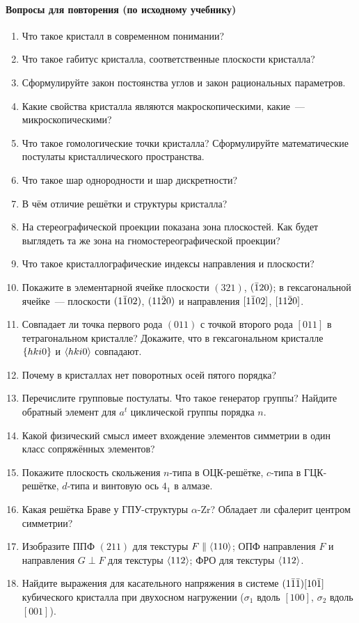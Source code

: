 \paragraph{Вопросы для повторения (по исходному учебнику)}
{\small
\begin{enumerate}[label=\arabic*.]
\item Что такое кристалл в современном понимании?
\item Что такое габитус кристалла, соответственные плоскости кристалла?
\item Сформулируйте закон постоянства углов и закон рациональных
параметров.
\item Какие свойства кристалла являются макроскопическими, какие~—
микроскопическими?
\item Что такое гомологические точки кристалла? Сформулируйте
математические постулаты кристаллического пространства.
\item Что такое шар однородности и шар дискретности?
\item В чём отличие решётки и структуры кристалла?
\item На стереографической проекции показана зона плоскостей. Как будет
выглядеть та же зона на гномостереографической проекции?
\item Что такое кристаллографические индексы направления и плоскости?
\item Покажите в элементарной ячейке плоскости $(321)$, $(\bar{1}20)$; в
гексагональной ячейке~— плоскости $(1\bar{1}02)$, $(11\bar{2}0)$ и направления
$[1\bar{1}02]$, $[11\bar{2}0]$.
\item Совпадает ли точка первого рода $(011)$ с точкой второго рода $[011]$
в тетрагональном кристалле? Докажите, что в гексагональном кристалле
$\{hki0\}$ и $\langle hki0\rangle$ совпадают.
\item Почему в кристаллах нет поворотных осей пятого порядка?
\item Перечислите групповые постулаты. Что такое генератор группы? Найдите
обратный элемент для $a^t$ циклической группы порядка $n$.
\item Какой физический смысл имеет вхождение элементов симметрии в один
класс сопряжённых элементов?
\item Покажите плоскость скольжения $n$-типа в ОЦК-решётке, $c$-типа в
ГЦК-решётке, $d$-типа и винтовую ось $4_1$ в алмазе.
\item Какая решётка Браве у ГПУ-структуры $\alpha$-Zr? Обладает ли
сфалерит центром симметрии?
\item Изобразите ППФ $(211)$ для текстуры $F\parallel\langle 110\rangle$; ОПФ направления
$F$ и направления $G\perp F$ для текстуры $\langle 112\rangle$; ФРО для текстуры
$\langle 112\rangle$.
\item Найдите выражения для касательного напряжения в системе
$(1\bar{1}\bar{1})[10\bar{1}]$ кубического кристалла при двухосном нагружении ($\sigma_1$
вдоль $[100]$, $\sigma_2$ вдоль $[001]$).
\end{enumerate}
}

